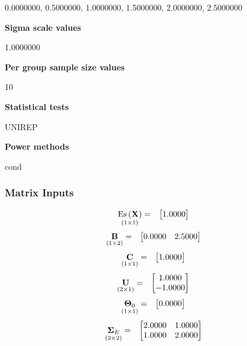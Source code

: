\documentclass{glimmpse-report}
\begin{document}
0.0000000, 0.5000000, 1.0000000, 1.5000000, 2.0000000, 2.5000000

{\bf Sigma scale values}

1.0000000

{\bf Per group sample size values}

10

{\bf Statistical tests}

UNIREP

{\bf Power methods}

cond

\subsubsection{Matrix Inputs}

\begin{eqnarray*}
\underset{\left(1\times1\right)}{\text{Es}\left(\mathbf{X}\right)} & = & \begin{bmatrix}1.0000\protect\\
\end{bmatrix}
\end{eqnarray*}
\begin{eqnarray*}
\underset{\left(1\times2\right)}{\mathbf{B}} & = & \begin{bmatrix}0.0000 & 2.5000\protect\\
\end{bmatrix}
\end{eqnarray*}
\begin{eqnarray*}
\underset{\left(1\times1\right)}{\mathbf{C}} & = & \begin{bmatrix}1.0000\protect\\
\end{bmatrix}
\end{eqnarray*}
\begin{eqnarray*}
\underset{\left(2\times1\right)}{\mathbf{U}} & = & \begin{bmatrix}1.0000\protect\\
-1.0000\protect\\
\end{bmatrix}
\end{eqnarray*}
\begin{eqnarray*}
\underset{\left(1\times1\right)}{\mathbf{\Theta}_0} & = & \begin{bmatrix}0.0000\protect\\
\end{bmatrix}
\end{eqnarray*}
\begin{eqnarray*}
\underset{\left(2\times2\right)}{\mathbf{\Sigma}_E} & = & \begin{bmatrix}2.0000 & 1.0000\protect\\
1.0000 & 2.0000\protect\\
\end{bmatrix}
\end{eqnarray*}
\end{document}
